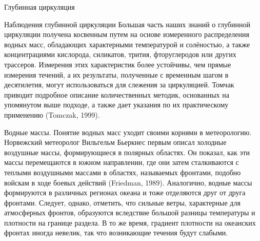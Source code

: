 \begin{chapter}{Глубинная циркуляция}
\begin{section}{Наблюдения глубинной циркуляции}
Большая часть наших знаний о глубинной циркуляции получена косвенным путем
на основе измеренного распределения водных масс, обладающих характерными
температурой и солёностью, а также концентрациями кислорода,
силикатов, трития, фторуглеродов или других трассеров. Измерения этих
характеристик более
устойчивы, чем прямые измерения течений, а их результаты, полученные 
с временным шагом в десятилетия, могут использоваться для слежения за
циркуляцией. Томчак приводит подробное описание количественных методик,
основанных на упомянутом выше подходе, а также дает указания по их 
практическому применению (Tomczak, 1999).
%

\begin{paragraph}{Водные массы.}
Понятие водных масс уходит своими корнями в метеорологию. Норвежский 
метеоролог Вильгельм Бьеркнес первым описал холодные воздушные массы, 
формирующиеся в полярных областях. Он показал, как эти массы перемещаются
в южном направлении, где они затем сталкиваются с теплыми воздушными массами
в областях, называемых фронтами, подобно войскам в ходе боевых 
действий (Friedman, 1989). Аналогично, водные массы формируются в различных
регионах океана и тоже отделяются друг от друга фронтами. Следует, однако, 
отметить, что сильные ветры, характерные для атмосферных фронтов, образуются 
вследствие большой разницы температуры и плотности на границе раздела. 
В то же время, градиент плотности на океанских фронтах иногда невелик, 
так что возникающие течения будут слабыми.
%


\end{paragraph}
\end{section}
\end{chapter}
